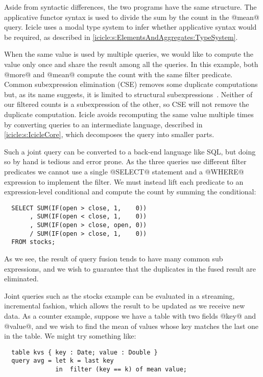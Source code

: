 Aside from syntactic differences, the two programs have the same structure.
The applicative functor syntax is used to divide the sum by the count in the @mean@ query.
Icicle uses a modal type system to infer whether applicative syntax would be required, as described in \autoref{icicle:s:ElementsAndAggregates:TypeSystem}.

When the same value is used by multiple queries, we would like to compute the value only once and share the result among all the queries.
In this example, both @more@ and @mean@ compute the count with the same filter predicate.
Common subexpression elimination (CSE) removes some duplicate computations but, as its name suggests, it is limited to structural subexpressions~\cite{chitil1997common}.
Neither of our filtered counts is a subexpression of the other, so CSE will not remove the duplicate computation.
Icicle avoids recomputing the same value multiple times by converting queries to an intermediate language, described in \autoref{icicle:s:IcicleCore}, which decomposes the query into smaller parts.


Such a joint query can be converted to a back-end language like SQL, but doing so by hand is tedious and error prone. As the three queries use different filter predicates we cannot use a single @SELECT@ statement and a @WHERE@ expression to implement the filter. We must instead lift each predicate to an expression-level conditional and compute the count by summing the conditional:
\begin{lstlisting}
  SELECT SUM(IF(open > close, 1,    0))
       , SUM(IF(open < close, 1,    0))
       , SUM(IF(open > close, open, 0))
       / SUM(IF(open > close, 1,    0))
  FROM stocks;
\end{lstlisting}

As we see, the result of query fusion tends to have many common sub expressions, and we wish to guarantee that the duplicates in the fused result are eliminated.

Joint queries such as the stocks example can be evaluated in a streaming, incremental fashion, which allows the result to be updated as we receive new data. As a counter example, suppose we have a table with two fields @key@ and @value@, and we wish to find the mean of values whose key matches the last one in the table. We might try something like:
\begin{lstlisting}
  table kvs { key : Date; value : Double }
  query avg = let k = last key
              in  filter (key == k) of mean value;
\end{lstlisting}


